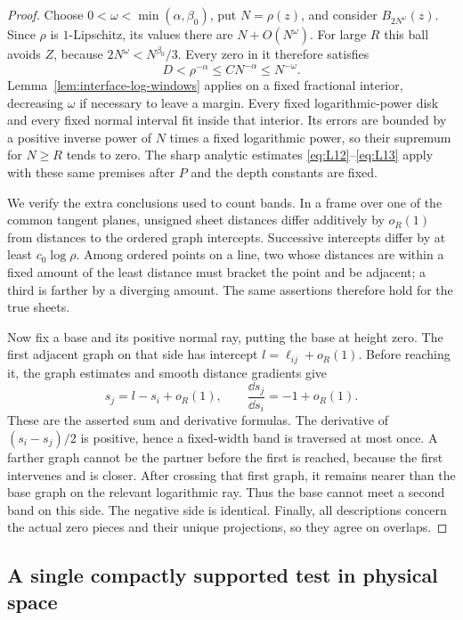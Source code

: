\begin{proof}
Choose $0<\omega<\min(\alpha,\beta_0)$, put $N=\rho(z)$, and consider
$B_{2N^\omega}(z)$. Since $\rho$ is $1$-Lipschitz, its values there are
$N+O(N^\omega)$. For large $R$ this ball avoids $Z$, because
$2N^\omega<N^{\beta_0}/3$. Every zero in it therefore satisfies
\[
 D<\rho^{-\alpha}\le CN^{-\alpha}\le N^{-\omega}.
\]
Lemma~\ref{lem:interface-log-windows} applies on a fixed fractional
interior, decreasing $\omega$ if necessary to leave a margin. Every
fixed logarithmic-power disk and every fixed normal interval fit
inside that interior. Its errors are bounded by a positive inverse
power of $N$ times a fixed logarithmic power, so their supremum for
$N\ge R$ tends to zero. The sharp analytic estimates
\eqref{eq:L12}--\eqref{eq:L13} apply with these same premises after
$P$ and the depth constants are fixed.

We verify the extra conclusions used to count bands. In a frame over
one of the common tangent planes, unsigned sheet distances differ
additively by $o_R(1)$ from distances to the ordered graph intercepts.
Successive intercepts differ by at least $c_0\log\rho$. Among ordered
points on a line, two whose distances are within a fixed amount of
the least distance must bracket the point and be adjacent; a third
is farther by a diverging amount. The same assertions therefore hold
for the true sheets.

Now fix a base and its positive normal ray, putting the base at height
zero. The first adjacent graph on that side has intercept
$l=\ell_{ij}+o_R(1)$. Before reaching it, the graph estimates and
smooth distance gradients give
\[
 s_j=l-s_i+o_R(1),\qquad\frac{\dd s_j}{\dd s_i}=-1+o_R(1).
\]
These are the asserted sum and derivative formulas. The derivative of
$(s_i-s_j)/2$ is positive, hence a fixed-width band is traversed at most
once. A farther graph cannot be the partner before the first is reached,
because the first intervenes and is closer. After crossing that first
graph, it remains nearer than the base graph on the relevant logarithmic
ray. Thus the base cannot meet a second band on this side. The negative
side is identical. Finally, all descriptions concern the actual zero
pieces and their unique projections, so they agree on overlaps.
\end{proof}

\subsection{A single compactly supported test in physical space}

